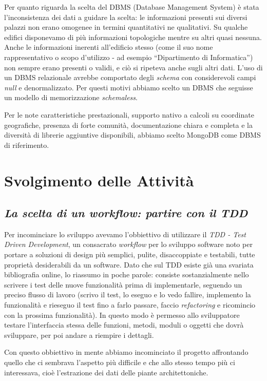 \documentclass[12pt]{report}
\begin{document}
Per quanto riguarda la scelta del DBMS (Database Management System) è stata l'inconsistenza dei dati a guidare la scelta: le informazioni presenti sui diversi palazzi non erano omogenee in termini quantitativi ne qualitativi. Su qualche edifici disponevamo di più informazioni topologiche mentre su altri quasi nessuna. Anche le informazioni inerenti all'edificio stesso (come il suo nome rappresentativo o scopo d'utilizzo - ad esempio ``Dipartimento di Informatica'') non sempre erano presenti o validi, e ciò si ripeteva anche sugli altri dati. L'uso di un DBMS relazionale avrebbe comportato degli \textit{schema} con considerevoli campi \textit{null} e denormalizzato. Per questi motivi abbiamo scelto un DBMS che seguisse un modello di memorizzazione \textit{schemaless}. 

Per le note caratteristiche prestazionali, supporto nativo a calcoli su coordinate geografiche, presenza di forte comunità, documentazione chiara e completa e la diversità di librerie aggiuntive disponibili, abbiamo scelto MongoDB come DBMS di riferimento.

% 
% 
\chapter{Svolgimento delle Attività}
\label{cap3}


\section{\textit{La scelta di un workflow: partire con il TDD}}

Per incominciare lo sviluppo avevamo l'obbiettivo di utilizzare il \textit{TDD - Test Driven Development}, un consacrato \textit{workflow} per lo sviluppo software noto per portare a soluzioni di design più semplici, pulite, disaccoppiate e testabili, tutte proprietà desiderabili da un software. Dato che sul TDD esiste già una svariata bibliografia online, lo riassumo in poche parole: consiste sostanzialmente nello scrivere i test delle nuove funzionalità prima di implementarle, seguendo un preciso flusso di lavoro (scrivo il test, lo eseguo e lo vedo fallire, implemento la funzionalità e rieseguo il test fino a farlo passare, faccio \textit{refactoring} e ricomincio con la prossima funzionalità). In questo modo è permesso allo sviluppatore testare l'interfaccia stessa delle funzioni, metodi, moduli o oggetti che dovrà sviluppare, per poi andare a riempire i dettagli.

Con questo obbiettivo in mente abbiamo incominciato il progetto affrontando quello che ci sembrava l'aspetto più difficile e che allo stesso tempo più ci interessava, cioè l'estrazione dei dati delle piante architettoniche. 
\end{document}
